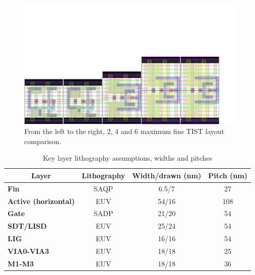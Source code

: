 \documentclass[pgmicro,diss,english]{iiufrgs}
\begin{document}
\begin{figure}[]
\centering
\includegraphics[width=1.5\textwidth, trim={0cm 0cm 3cm 8cm},clip, angle=90]{TISTComp.pdf}
\caption{From the left to the right, 2, 4 and 6 maximum fins TIST layout comparison.}
\label{fig:tistComp}
\end{figure}

\begin{table}[]
\centering
\caption{Key layer lithography assumptions, widths and pitches}
\label{layers}
\begin{tabular}{lccc}
\hline
\multicolumn{1}{c}{\textbf{Layer}} & \textbf{Lithography} & \textbf{Width/drawn (nm)} & \textbf{Pitch (nm)} \\ \hline
\textbf{Fin}                         & SAQP                 & 6.5/7                     & 27                  \\ \hline
\textbf{Active (horizontal)}         & EUV                  & 54/16                     & 108                 \\ \hline
\textbf{Gate}                        & SADP                 & 21/20                     & 54                  \\ \hline
\textbf{SDT/LISD}                    & EUV                  & 25/24                     & 54                  \\ \hline
\textbf{LIG}                         & EUV                  & 16/16                     & 54                  \\ \hline
\textbf{VIA0-VIA3}                   & EUV                  & 18/18                     & 25                  \\ \hline
\textbf{M1-M3}                       & EUV                  & 18/18                     & 36                  \\ \hline
\end{tabular}
\end{table}
\end{document}
